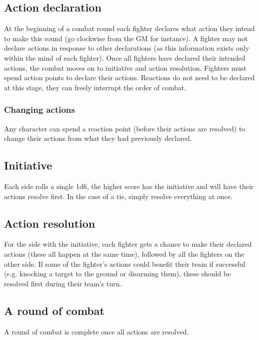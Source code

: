 \documentclass[a4paper,10pt,oneside]{book}
\newcommand{\textlf}[1]{\textbf{\titlecap{#1}}}
\begin{document}
\subsection{Action declaration}
At the beginning of a combat round each fighter declares what action they intend to make this round (go clockwise from the GM for instance). A fighter may not declare actions in response to other declarations (as this information exists only within the mind of each fighter). Once all fighters have declared their intended actions, the combat moves on to initiative and action resolution. Fighters must spend action points to declare their actions. Reactions do not need to be declared at this stage, they can freely interrupt the order of combat.

\subsubsection{Changing actions}
Any character can spend a reaction point (before their actions are resolved) to change their actions from what they had previously declared. 

\subsection{Initiative}
Each side rolls a single 1d6, the higher score has the initiative and will have their actions resolve first. In the case of a tie, simply resolve everything at once.

\subsection{Action resolution}
For the side with the initiative, each fighter gets a chance to make their declared actions (these all happen at the same time), followed by all the fighters on the other side. If some of the fighter's actions could benefit their team if successful (e.g. knocking a target to the ground or disarming them), these should be resolved first during their team's turn.

\subsection{A round of combat}
A round of combat is complete once all actions are resolved. 

\end{document}
